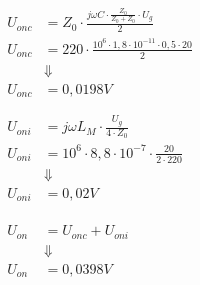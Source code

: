 \begin{enumerate}
    \begin{equation}
        \begin{split}
            U_{onc} &= Z_{0} \cdot \frac{j \omega C \cdot \frac{Z_{0}}{Z_{0}+ Z_{0}} \cdot U_{g}}{2}\\
            U_{onc} &= 220 \cdot \frac{10^6 \cdot 1,8 \cdot 10^{-11} \cdot 0,5 \cdot 20}{2}\\
            &\Downarrow \\
            U_{onc} &= 0,0198 V
            \\
            \\
            \\
            U_{oni} &= j \omega L_{M} \cdot \frac{U_{g}}{4 \cdot Z_{0}}\\
            U_{oni} &= 10^6 \cdot 8,8 \cdot 10^{-7} \cdot \frac{20}{2 \cdot 220}\\
            &\Downarrow \\
            U_{oni} &= 0,02 V\\
            \\
            \\
            \\
            U_{on} &= U_{onc} + U_{oni}\\
            &\Downarrow \\
            U_{on} &= 0,0398 V
        \end{split}
    \end{equation}

\end{enumerate}
